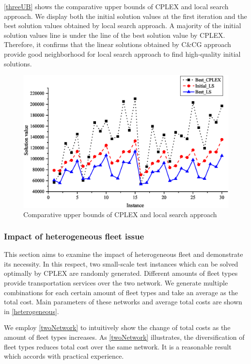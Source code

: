 \documentclass[11pt,nonblindrev,fleqn]{article}
\begin{document}
\autoref{threeUB} shows the comparative upper bounds of CPLEX and local search approach. We display both the initial solution values at the first iteration and the best solution values obtained by local search approach. A majority of the initial solution values line is under the line of the best solution value by CPLEX. Therefore, it confirms that the linear solutions obtained by C\&CG approach provide good neighborhood for local search approach to find high-quality initial solutions.

\begin{figure}[H]
\setlength{\abovecaptionskip}{-5pt}
\setlength{\belowcaptionskip}{-5pt}
\centering
\includegraphics[width=0.9\linewidth]{F5.eps}
\caption{Comparative upper bounds of CPLEX and local search approach}
\label{threeUB}
\end{figure}

\subsubsection{Impact of heterogeneous fleet issue}
This section aims to examine the impact of heterogeneous fleet and demonstrate its necessity. In this respect, two small-scale test instances which can be solved optimally by CPLEX are randomly generated. Different amounts of fleet types provide transportation services over the two network. We generate multiple combinations for each certain amount of fleet types and take an average as the total cost. Main parameters of these networks and average total costs are shown in \autoref{heterogeneous}.

We employ \autoref{twoNetwork} to intuitively show the change of total costs as the amount of fleet types increases. As \autoref{twoNetwork} illustrates, the diversification of fleet types reduces total cost over the same network. It is a reasonable result which accords with practical experience.
\end{document}
